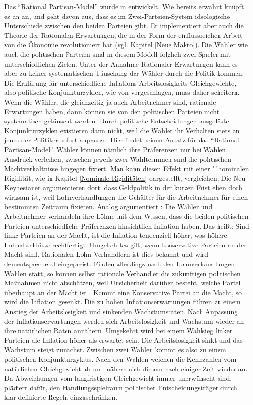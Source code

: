 Das "`Rational Partisan-Model"' wurde in \textcite{Alesina1987} entwickelt. Wie bereits erwähnt knüpft es an \textcite{Hibbs1977} an, und geht davon aus, dass es im Zwei-Parteien-System ideologische Unterschiede zwischen den beiden Parteien gibt. Er implementiert aber auch die Theorie der Rationalen Erwartungen, die in der Form der einflussreichen Arbeit von \textcite{Kydland1977} die Ökonomie revolutioniert hat (vgl. Kapitel \ref{Neue Makro}). Die Wähler wie auch die politischen Parteien sind in diesem Modell folglich zwei Spieler mit unterschiedlichen Zielen. Unter der Annahme Rationaler Erwartungen kann es aber zu keiner systematischen Täuschung der Wähler durch die Politik kommen. Die Erklärung für unterschiedliche Inflations-Arbeitslosigkeits-Gleichgewichte, also politische Konjunkturzyklen, wie von \textcite{Nordhaus1975} vorgeschlagen, muss daher scheitern. Wenn die Wähler, die gleichzeitig ja auch Arbeitnehmer sind, rationale Erwartungen haben, dann können sie von den politischen Parteien nicht systematisch getäuscht werden. Durch politische Entscheidungen ausgelöste Konjunkturzyklen existieren dann nicht, weil die Wähler ihr Verhalten stets an jenes der Politiker sofort anpassen. Hier findet \textcite{Alesina1987} seinen Ansatz für das "`Rational Partisan-Model"'. Wähler können nämlich ihre Präferenzen nur bei Wahlen Ausdruck verleihen, zwischen jeweils zwei Wahlterminen sind die politischen Machtverhältnisse hingegen fixiert. Man kann diesen Effekt mit einer "`nominalen Rigidität, wie in Kapitel \ref{Nominale Rigiditäten} dargestellt, vergleichen. Die Neu-Keynesianer argumentieren dort, dass Geldpolitik in der kurzen Frist eben doch wirksam ist, weil Lohnverhandlungen die Gehälter für die Arbeitnehmer für einen bestimmten Zeitraum fixieren. Analog argumentiert \textcite{Alesina1987}: Die Wähler und Arbeitnehmer verhandeln ihre Löhne mit dem Wissen, dass die beiden politischen Parteien unterschiedliche Präferenzen hinsichtlich Inflation haben. Das heißt: Sind linke Parteien an der Macht, ist die Inflation tendenziell höher, was höhere Lohnabschlüsse rechtfertigt. Umgekehrtes gilt, wenn konservative Parteien an der Macht sind. Rationalen Lohn-Verhandlern ist dies bekannt und wird dementsprechend eingepreist. Finden allerdings nach den Lohnverhandlungen Wahlen statt, so können selbst rationale Verhandler die zukünftigen politischen Maßnahmen nicht abschätzen, weil Unsicherheit darüber besteht, welche Partei überhaupt an der Macht ist \parencite[S. 653]{Alesina1987}. Kommt eine Konservative Partei an die Macht, so wird die Inflation gesenkt. Die zu hohen Inflationserwartungen führen zu einem Anstieg der Arbeitslosigkeit und sinkenden Wachstumsraten. Nach Anpassung der Inflationserwartungen werden sich Arbeitslosigkeit und Wachstum wieder an ihre natürlichen Raten annähern. Umgekehrt wird bei einem Wahlsieg linker Parteien die Inflation höher als erwartet sein. Die Arbeitslosigkeit sinkt und das Wachstum steigt zunächst. Zwischen zwei Wahlen kommt es also zu einem politischen Konjunkturzyklus. Nach den Wahlen weichen die Kennzahlen vom natürlichen Gleichgewicht ab und nähern sich diesem nach einiger Zeit wieder an. Da Abweichungen vom langfristigen Gleichgewicht immer unerwünscht sind, plädiert \textcite[S. 653]{Alesina1987} dafür, den Handlungsspielraum politischer Entscheidungsträger durch klar definierte Regeln einzuschränken.
